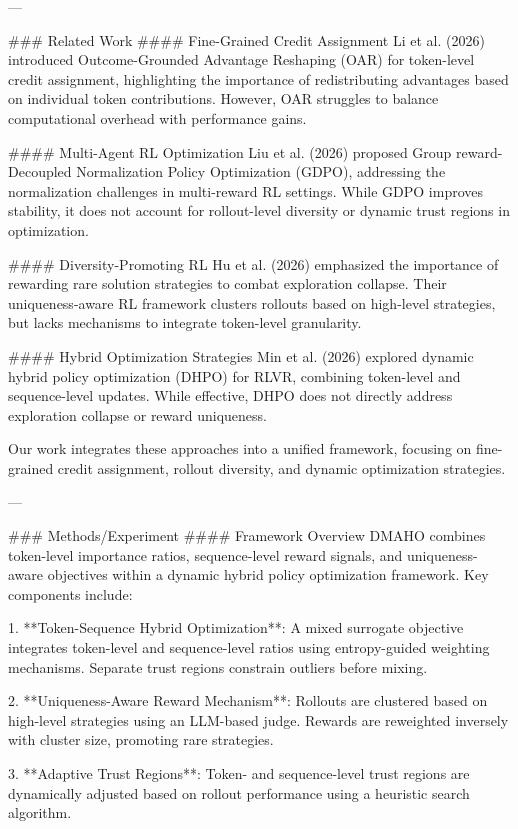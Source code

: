 ---

### Related Work
#### Fine-Grained Credit Assignment
Li et al. (2026) introduced Outcome-Grounded Advantage Reshaping (OAR) for token-level credit assignment, highlighting the importance of redistributing advantages based on individual token contributions. However, OAR struggles to balance computational overhead with performance gains.

#### Multi-Agent RL Optimization
Liu et al. (2026) proposed Group reward-Decoupled Normalization Policy Optimization (GDPO), addressing the normalization challenges in multi-reward RL settings. While GDPO improves stability, it does not account for rollout-level diversity or dynamic trust regions in optimization.

#### Diversity-Promoting RL
Hu et al. (2026) emphasized the importance of rewarding rare solution strategies to combat exploration collapse. Their uniqueness-aware RL framework clusters rollouts based on high-level strategies, but lacks mechanisms to integrate token-level granularity.

#### Hybrid Optimization Strategies
Min et al. (2026) explored dynamic hybrid policy optimization (DHPO) for RLVR, combining token-level and sequence-level updates. While effective, DHPO does not directly address exploration collapse or reward uniqueness.

Our work integrates these approaches into a unified framework, focusing on fine-grained credit assignment, rollout diversity, and dynamic optimization strategies.

---

### Methods/Experiment
#### Framework Overview
DMAHO combines token-level importance ratios, sequence-level reward signals, and uniqueness-aware objectives within a dynamic hybrid policy optimization framework. Key components include:

1. **Token-Sequence Hybrid Optimization**: A mixed surrogate objective integrates token-level and sequence-level ratios using entropy-guided weighting mechanisms. Separate trust regions constrain outliers before mixing.
   
2. **Uniqueness-Aware Reward Mechanism**: Rollouts are clustered based on high-level strategies using an LLM-based judge. Rewards are reweighted inversely with cluster size, promoting rare strategies.

3. **Adaptive Trust Regions**: Token- and sequence-level trust regions are dynamically adjusted based on rollout performance using a heuristic search algorithm.

